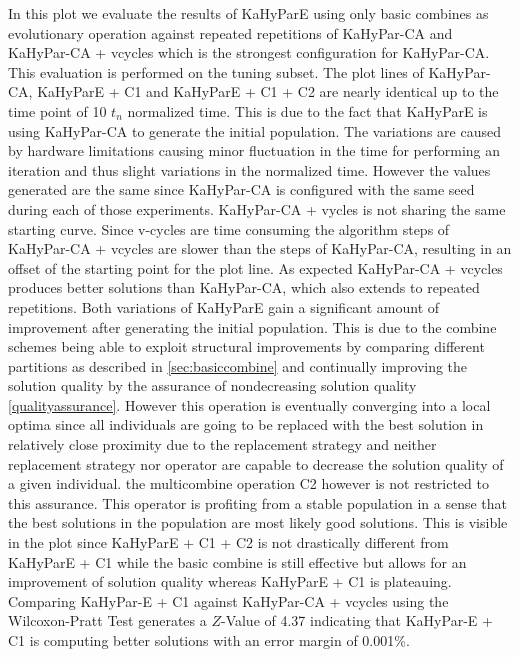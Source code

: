 \documentclass[a4paper,12pt,bibtotoc,titlepage, liststotoc,BCOR7mm,headsepline,pointlessnumbers]{scrbook}
\numberwithin{equation}{section}
\begin{document}
In this plot we evaluate the results of KaHyParE using only basic combines as evolutionary operation against repeated repetitions of KaHyPar-CA and KaHyPar-CA + vcycles which is the strongest configuration for KaHyPar-CA. This evaluation is performed on the tuning subset. The plot lines of KaHyPar-CA, KaHyParE + C1 and KaHyParE + C1 + C2 are nearly identical up to the time point of 10 $t_n$ normalized time. This is due to the fact that KaHyParE is using KaHyPar-CA to generate the initial population. The variations are caused by hardware limitations causing minor fluctuation in the time for performing an iteration and thus slight variations in the normalized time. However the values generated are the same since KaHyPar-CA is configured with the same seed during each of those experiments. KaHyPar-CA + vycles is not sharing the same starting curve. Since v-cycles are time consuming the algorithm steps of KaHyPar-CA + vcycles are slower than the steps of KaHyPar-CA, resulting in an offset of the starting point for the plot line. As expected KaHyPar-CA + vcycles produces better solutions than KaHyPar-CA, which also extends to repeated repetitions. Both variations of KaHyParE gain a significant amount of improvement after generating the initial population. This is due to the combine schemes being able to exploit structural improvements by comparing different partitions as described in \ref{sec:basiccombine} and continually improving the solution quality by the assurance of nondecreasing solution quality \ref{qualityassurance}. However this operation is eventually converging into a local optima since all individuals are going to be replaced with the best solution in relatively close proximity due to the replacement strategy and neither replacement strategy nor operator are capable to decrease the solution quality of a given individual. the multicombine operation C2 however is not restricted to this assurance. This operator is profiting from a stable population in a sense that the best solutions in the population are most likely good solutions. This is visible in the plot since KaHyParE + C1 + C2 is not drastically different from KaHyParE + C1 while the basic combine is still effective but allows for an improvement of solution quality whereas KaHyParE + C1 is plateauing. Comparing KaHyPar-E + C1 against KaHyPar-CA + vcycles using the Wilcoxon-Pratt Test generates a $Z$-Value of 4.37 indicating that KaHyPar-E + C1 is computing better solutions with an error margin of 0.001\%.
\end{document}
